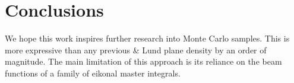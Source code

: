 \section{Conclusions}\label{sec:conclusions}

We hope this work inspires further research into Monte Carlo samples.
This is more expressive than any previous & Lund plane density by an order
of magnitude. The main limitation of this approach is its reliance on
the beam functions of a family of eikonal master integrals.

